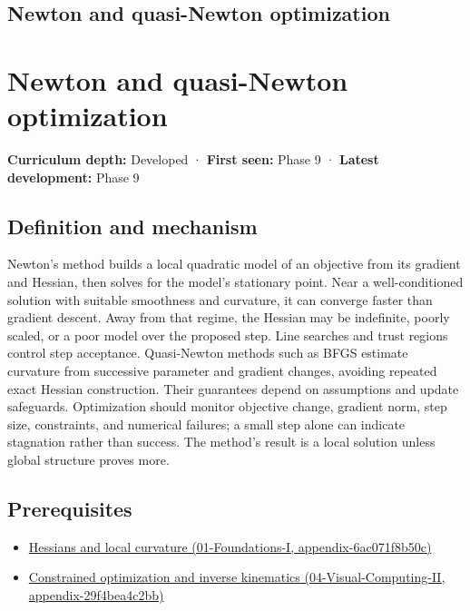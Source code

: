 \hypertarget{appendix-54c8f5828387}{}
\section*{Newton and quasi-Newton optimization}
\chapter{Newton and quasi-Newton optimization}\label{appendix-54c8f5828387-newton-and-quasi-newton-optimization}

\textbf{Curriculum depth:} Developed · \textbf{First seen:} Phase 9 · \textbf{Latest development:} Phase 9

\section{Definition and mechanism}\label{appendix-54c8f5828387-definition-and-mechanism}

Newton's method builds a local quadratic model of an objective from its gradient and Hessian, then solves for the model's stationary point. Near a well-conditioned solution with suitable smoothness and curvature, it can converge faster than gradient descent. Away from that regime, the Hessian may be indefinite, poorly scaled, or a poor model over the proposed step. Line searches and trust regions control step acceptance. Quasi-Newton methods such as BFGS estimate curvature from successive parameter and gradient changes, avoiding repeated exact Hessian construction. Their guarantees depend on assumptions and update safeguards. Optimization should monitor objective change, gradient norm, step size, constraints, and numerical failures; a small step alone can indicate stagnation rather than success. The method's result is a local solution unless global structure proves more.

\section{Prerequisites}\label{appendix-54c8f5828387-prerequisites}

\begin{itemize}
\tightlist
\item
  \href{../01-Foundations-I/main.pdf\#nameddest=appendix-6ac071f8b50c}{Hessians and local curvature (01-Foundations-I, appendix-6ac071f8b50c)}
\item
  \href{../04-Visual-Computing-II/main.pdf\#nameddest=appendix-29f4bea4c2bb}{Constrained optimization and inverse kinematics (04-Visual-Computing-II, appendix-29f4bea4c2bb)}
\end{itemize}

